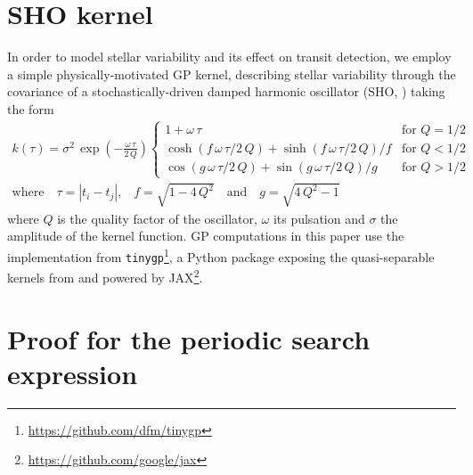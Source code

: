 \documentclass[modern]{aastex631}
\begin{document}
\newpage
\appendix
\section{SHO kernel}\label{app_gp}
In order to model stellar variability and its effect on transit detection, we employ a simple physically-motivated GP kernel, describing stellar variability through the covariance of a stochastically-driven damped harmonic oscillator (SHO, \citealt{celerite, celerite2}) taking the form 
\begin{equation}
    \begin{gathered}
        k(\tau) = \sigma^2\,\exp\left(-\frac{\omega\,\tau}{2\,Q}\right)
        \left\{\begin{array}{ll}
            1 + \omega\,\tau & \mbox{for } Q = 1/2 \\
            \cosh(f\,\omega\,\tau/2\,Q) + \sinh(f\,\omega\,\tau/2\,Q)/f
                & \mbox{for } Q < 1/2 \\
            \cos(g\,\omega\,\tau/2\,Q) + \sin(g\,\omega\,\tau/2\,Q)/g
                & \mbox{for } Q > 1/2
        \end{array}\right. \\
        \text{where}\quad \tau = |t_i - t_j|\text{,}\quad f = \sqrt{1 - 4\,Q^2} \quad \text{and}\quad g = \sqrt{4\,Q^2 - 1}
    \end{gathered}
\end{equation}
where $Q$ is the quality factor of the oscillator, $\omega$ its pulsation and $\sigma$ the amplitude of the kernel function. GP computations in this paper use the implementation from \texttt{tinygp}\footnote{\href{https://github.com/dfm/tinygp}{https://github.com/dfm/tinygp}}, a Python package exposing the quasi-separable kernels from \cite{celerite2} and powered by \textsf{JAX}\footnote{\href{https://github.com/google/jax}{https://github.com/google/jax}}.

\section{Proof for the periodic search expression}\label{proof}
\end{document}
